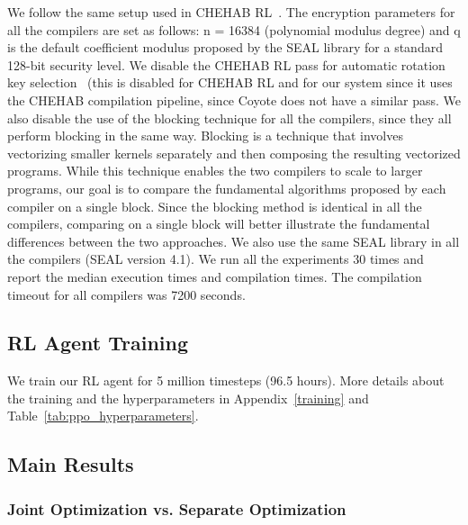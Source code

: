 We follow the same setup used in CHEHAB RL~\cite{ChehabRL}. The encryption parameters for all the compilers are set as follows: n = 16384 (polynomial modulus degree) and q is the default coefficient modulus proposed by the SEAL library for a standard 128-bit security level.
We disable the CHEHAB RL pass for automatic rotation key selection~\cite{ChehabRL} (this is disabled for CHEHAB RL and for our system since it uses the CHEHAB compilation pipeline, since Coyote does not have a similar pass.
We also disable the use of the blocking technique \cite{Malik2023Coyote} for all the compilers, since they all perform blocking in the same way. Blocking is a technique that involves vectorizing smaller kernels separately and then composing the resulting vectorized programs. While this technique enables the two compilers to scale to larger programs, our goal is to compare the fundamental algorithms proposed by each compiler on a single block. Since the blocking method is identical in all the compilers, comparing on a single block will better illustrate the fundamental differences between the two approaches. 
We also use the same SEAL library in all the compilers (SEAL version 4.1). We run all the experiments 30 times and report the median execution times and compilation times. The compilation timeout for all compilers was 7200 seconds.


\subsection{RL Agent Training} \label{sec:evaluation:agent_training}
We train our RL agent for 5 million timesteps (96.5 hours). More details about \ifshowextra the training and \fi the hyperparameters in
\ifshowextra Appendix~\ref{training} and \fi Table~\ref{tab:ppo_hyperparameters}.



\shrink[1]

\subsection{Main Results \label{sec:evaluation:main-results}}






\subsubsection{Joint Optimization vs. Separate Optimization
\label{sec:evaluation:joint-vs-separate}}



